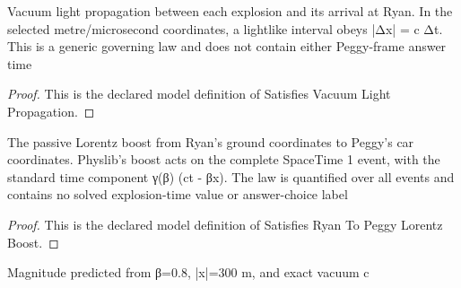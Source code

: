 \begin{definition}
  \label{def:physics:phyx-mini-0633:phyxminiproblems-problemphyxmini0633-satisfiesvacuumlightpropagation}
  Vacuum light propagation between each explosion and its arrival at Ryan. In the selected metre/microsecond coordinates, a lightlike interval obeys |Δx| = c Δt. This is a generic governing law and does not contain either Peggy-frame answer time
\end{definition}
\begin{proof}
  This is the declared model definition of Satisfies Vacuum Light Propagation.
\end{proof}
\begin{definition}
  \label{def:physics:phyx-mini-0633:phyxminiproblems-problemphyxmini0633-satisfiesryantopeggylorentzboost}
  The passive Lorentz boost from Ryan's ground coordinates to Peggy's car coordinates. Physlib's boost acts on the complete SpaceTime 1 event, with the standard time component γ(β) (ct - βx). The law is quantified over all events and contains no solved explosion-time value or answer-choice label
\end{definition}
\begin{proof}
  This is the declared model definition of Satisfies Ryan To Peggy Lorentz Boost.
\end{proof}
\begin{definition}
  \label{def:physics:phyx-mini-0633:phyxminiproblems-problemphyxmini0633-predictedpeggyexplosiontimemagnitudemicroseconds}
  Magnitude predicted from β=0.8, |x|=300 m, and exact vacuum c
\end{definition}
